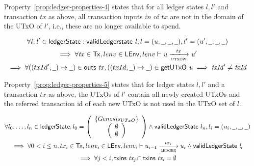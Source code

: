 Property~\ref{prop:ledger-properties-4} states that for all ledger states
$l, l'$ and transaction $tx$ as above, all transaction inputs $in$ of $tx$ are
not in the domain of the UTxO of $l'$, i.e., these are no longer available to
spend.

\begin{property}
  \begin{multline*}
    \forall \var{l}, \var{l'} \in \ledgerState: \applyFun{validLedgerstate}{l},
    l=(u,\wcard,\wcard,\wcard), l' = (u',\wcard,\wcard,\wcard)\\
    \implies \forall \var{tx} \in \Tx, lenv \in\LEnv, lenv \vdash \var{u}
    \trans{utxow}{tx} \var{u'} \\ \implies \forall ((txId', \wcard) \mapsto
    \wcard) \in \applyFun{outs}{tx}, ((txId, \wcard) \mapsto \wcard)
    \in\applyFun{getUTxO}{u} \implies \var{txId'} \neq \var{txId}
  \end{multline*}
  \label{prop:ledger-properties-5}
\end{property}

Property~\ref{prop:ledger-properties-5} states that for ledger states $l, l'$
and a transaction $tx$ as above, the UTxOs of $l'$ contain all newly created
UTxOs and the referred transaction id of each new UTxO is not used in the UTxO
set of $l$.

\begin{property}
  \begin{multline*}
    \forall l_{0},\ldots,l_{n} \in \ledgerState, l_{0} =
    \left(
      \begin{array}{c}
        \left\{
        \genesisUTxO
        \right\} \\
        \left(
        \begin{array}{c}
          \emptyset\\
          \emptyset
        \end{array}
        \right)
      \end{array}
    \right) \wedge \applyFun{validLedgerState} l_{n}, l_{i}=(u_{i},\wcard,\wcard,\wcard)\\
    \implies \forall 0 < i \leq n, tx_{i} \in \Tx, lenv_{i}\in\LEnv,
    lenv_{i} \vdash u_{i-1}
    \trans{ledger}{tx_{i}} u_{i} \wedge \applyFun{validLedgerState} l_{i} \\
    \implies \forall j < i, \applyFun{txins}{tx_{j}} \cap
    \applyFun{txins}{tx_{i}} = \emptyset
  \end{multline*}
  \label{prop:ledger-properties-no-double-spend}
\end{property}

